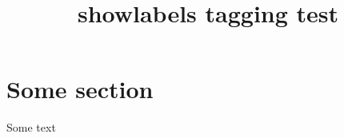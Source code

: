 \documentclass{article}
\title{showlabels tagging test}
\begin{document}
\section{Some section}
\label{sec}

Some text

\cite{inbook-full}



\end{document}
